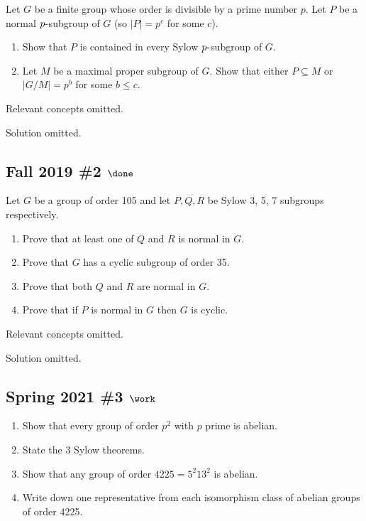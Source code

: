 Let \(G\) be a finite group whose order is divisible by a prime number
\(p\). Let \(P\) be a normal \(p{\hbox{-}}\)subgroup of \(G\) (so
\({\left\lvert {P} \right\rvert} = p^c\) for some \(c\)).

\begin{enumerate}
\def\labelenumi{\alph{enumi}.}
\item
  Show that \(P\) is contained in every Sylow \(p{\hbox{-}}\)subgroup of
  \(G\).
\item
  Let \(M\) be a maximal proper subgroup of \(G\). Show that either
  \(P \subseteq M\) or \(|G/M | = p^b\) for some \(b \leq c\).
\end{enumerate}

Relevant concepts omitted.

Solution omitted.

\hypertarget{fall-2019-2-done}{%
\subsection{\texorpdfstring{Fall 2019 \#2
\(\done\)}{Fall 2019 \#2 \textbackslash done}}\label{fall-2019-2-done}}

Let \(G\) be a group of order 105 and let \(P, Q, R\) be Sylow 3, 5, 7
subgroups respectively.

\begin{enumerate}
\def\labelenumi{\alph{enumi}.}
\item
  Prove that at least one of \(Q\) and \(R\) is normal in \(G\).
\item
  Prove that \(G\) has a cyclic subgroup of order 35.
\item
  Prove that both \(Q\) and \(R\) are normal in \(G\).
\item
  Prove that if \(P\) is normal in \(G\) then \(G\) is cyclic.
\end{enumerate}

Relevant concepts omitted.

Solution omitted.

\hypertarget{spring-2021-3-work}{%
\subsection{\texorpdfstring{Spring 2021 \#3
\(\work\)}{Spring 2021 \#3 \textbackslash work}}\label{spring-2021-3-work}}

\begin{enumerate}
\def\labelenumi{\alph{enumi}.}
\item
  Show that every group of order \(p^2\) with \(p\) prime is abelian.
\item
  State the 3 Sylow theorems.
\item
  Show that any group of order \(4225 = 5^2 13^2\) is abelian.
\item
  Write down one representative from each isomorphism class of abelian
  groups of order 4225.
\end{enumerate}

